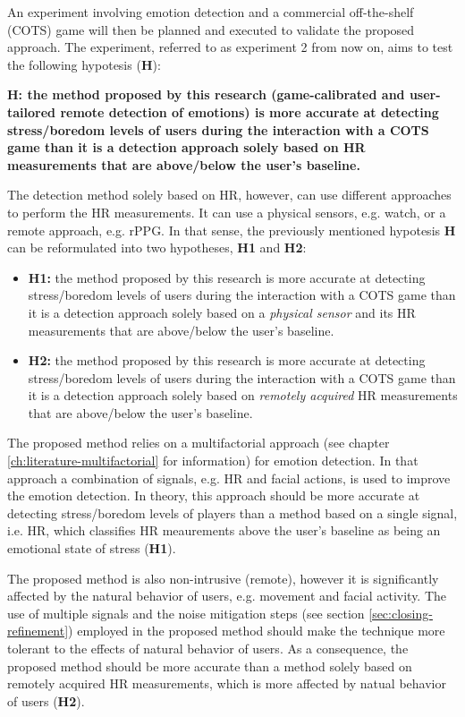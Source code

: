 An experiment involving emotion detection and a commercial off-the-shelf (COTS) game will then be planned and executed to validate the proposed approach. The experiment, referred to as experiment 2 from now on, aims to test the following hypotesis (\textbf{H}):

\textbf{H: the method proposed by this research (game-calibrated and user-tailored remote detection of emotions) is more accurate at detecting stress/boredom levels of users during the interaction with a COTS game than it is a detection approach solely based on HR measurements that are above/below the user's baseline.}

The detection method solely based on HR, however, can use different approaches to perform the HR measurements. It can use a physical sensors, e.g. watch, or a remote approach, e.g. rPPG. In that sense, the previously mentioned hypotesis \textbf{H} can be reformulated into two hypotheses, \textbf{H1} and \textbf{H2}:

\begin{itemize}
  \item \textbf{H1:} the method proposed by this research is more accurate at detecting stress/boredom levels of users during the interaction with a COTS game than it is a detection approach solely based on a \textit{physical sensor} and its HR measurements that are above/below the user's baseline.
  \item \textbf{H2:} the method proposed by this research is more accurate at detecting stress/boredom levels of users during the interaction with a COTS game than it is a detection approach solely based on \textit{remotely acquired} HR measurements that are above/below the user's baseline.
\end{itemize}

The proposed method relies on a multifactorial approach (see chapter \ref{ch:literature-multifactorial} for information) for emotion detection. In that approach a combination of signals, e.g. HR and facial actions, is used to improve the emotion detection. In theory, this approach should be more accurate at detecting stress/boredom levels of players than a method based on a single signal, i.e. HR, which classifies HR meaurements above the user's baseline as being an emotional state of stress (\textbf{H1}).

The proposed method is also non-intrusive (remote), however it is significantly affected by the natural behavior of users, e.g. movement and facial activity. The use of multiple signals and the noise mitigation steps (see section \ref{sec:closing-refinement}) employed in the proposed method should make the technique more tolerant to the effects of natural behavior of users. As a consequence, the proposed method should be more accurate than a method solely based on remotely acquired HR measurements, which is more affected by natual behavior of users (\textbf{H2}).


